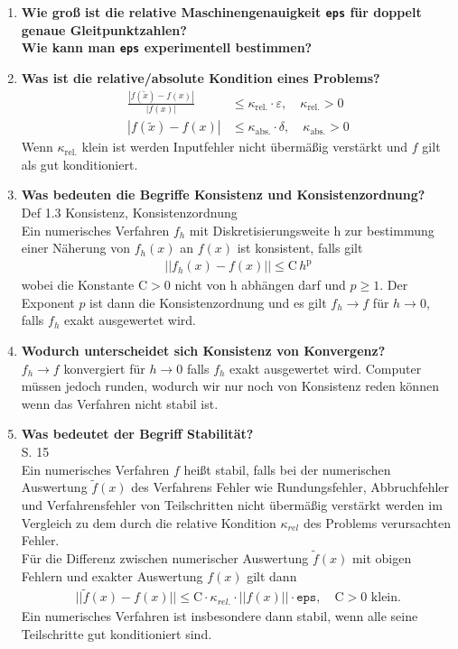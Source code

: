 \begin{enumerate}
		\item \textbf{Wie groß ist die relative Maschinengenauigkeit \texttt{eps} für doppelt genaue Gleitpunktzahlen?\\
					Wie kann man \texttt{eps} experimentell bestimmen?} \\
				
				
		\item \textbf{Was ist die relative/absolute Kondition eines Problems?} \\
			\begin{align*}
				\frac{|f(\tilde{x})-f(x)|}{|f(x)|} &\leq \kappa_{\text{rel.}}\cdot\varepsilon, \quad \kappa_{\text{rel.}} > 0 \\
				|f(\tilde{x})-f(x)| &\leq \kappa_{\text{abs.}}\cdot\delta, \quad \kappa_{\text{abs.}} > 0
			\end{align*}
		Wenn $\kappa_{\text{rel.}}$ klein ist werden Inputfehler nicht übermäßig verstärkt und $f$ gilt als gut konditioniert.
		\item \textbf{Was bedeuten die Begriffe Konsistenz und Konsistenzordnung?} \\
			Def 1.3 Konsistenz, Konsistenzordnung \\
			Ein numerisches Verfahren $f_h$ mit Diskretisierungsweite h zur bestimmung einer Näherung von $f_h(x)$ an $f(x)$ ist konsistent, falls gilt
			\begin{align*}
				||f_h(x)-f(x)||\leq \text{C}\,h^\text{p}
			\end{align*}
			wobei die Konstante $\text{C}>0$ nicht von h abhängen darf und $p\ge1$. Der Exponent $p$ ist dann die Konsistenzordnung und es gilt $f_h\rightarrow f$ für $ h \rightarrow 0$, falls $f_h$ exakt ausgewertet wird. 
		
		\item \textbf{Wodurch unterscheidet sich Konsistenz von Konvergenz?} \\
			$f_h\rightarrow f$ konvergiert für $ h \rightarrow 0$ falls $f_h$ exakt ausgewertet wird. Computer müssen jedoch runden, wodurch wir nur noch von Konsistenz reden können wenn das Verfahren nicht stabil ist.
		
		\item \textbf{Was bedeutet der Begriff Stabilität?} \\
		S. 15\\
		Ein numerisches Verfahren $f$ heißt stabil, falls bei der numerischen Auswertung $\tilde{f}(x)$ des Verfahrens Fehler wie Rundungsfehler, Abbruchfehler und Verfahrensfehler von Teilschritten nicht	übermäßig verstärkt werden im Vergleich zu dem durch die relative Kondition $\kappa_{rel}$ des Problems verursachten Fehler. \\
		Für die Differenz zwischen numerischer Auswertung $\tilde{f}(x)$ mit obigen Fehlern und exakter Auswertung $f(x)$ gilt dann
		\begin{align*}
			||\tilde{f}(x)-f(x)||\leq \text{C}\cdot\kappa_{rel.}\cdot||f(x)||\cdot\texttt{eps}, \quad \text{C} > 0 \text{ klein.}
		\end{align*}
		Ein numerisches Verfahren ist insbesondere dann stabil, wenn alle seine Teilschritte gut konditioniert sind.
		
	\end{enumerate}